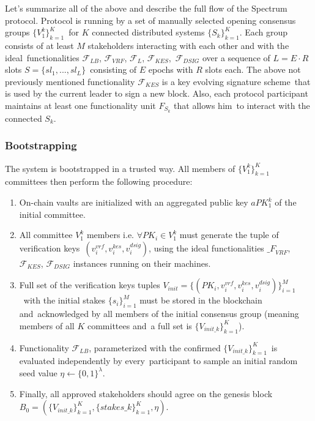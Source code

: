 Let's summarize all of the above and describe the full flow of the Spectrum protocol.
Protocol is running by a set of manually selected opening consensus groups $\{V^k_1\}_{k=1}^K$\
for $K$ connected distributed systems $\{S_k\}_{k=1}^K$.
Each group consists of at least $M$ stakeholders interacting with each other and with the ideal\
functionalities ${\mathcal{F}}_{LB}$, ${\mathcal{F}}_{VRF}$, ${\mathcal{F}}_{L}$, ${\mathcal{F}}_{KES}$,\
${\mathcal{F}}_{DSIG}$ over a sequence of $L = E \cdot R$ slots ${S=\{sl_1,...,sl_L\}}$\
consisting of $E$ epochs with $R$ slots each.
The above not previously mentioned functionality ${\mathcal{F}}_{KES}$ is a key evolving signature scheme\
that is used by the current leader to sign a new block.
Also, each protocol participant maintains at least one functionality unit $F_{S_k}$ that allows him\
to interact with the connected $S_k$.

\subsubsection{Bootstrapping}\label{subsubsec:bootstrapping}

The system is bootstrapped in a trusted way.
All members of $\{V^k_1\}_{k=1}^K$ committees then perform the following procedure:
\begin{enumerate}
    \item On-chain vaults are initialized with an aggregated public key $aPK^k_1$ of the initial committee.

    \item All committee $V^k_1$ members i.e. $\forall PK_i \in V^k_1$ must generate the tuple of verification keys\
    ${(v_i^{vrf}, v_i^{kes}, v_i^{dsig})}$, using the ideal functionalities ${\mathcal_{F}}_{VRF}$,\
    ${\mathcal{F}}_{KES}$, ${\mathcal{F}}_{DSIG}$ instances running on their machines.

    \item Full set of the verification keys tuples ${V_{init} = \{(PK_i, v_i^{vrf}, v_i^{kes}, v_i^{dsig})\}_{i=1}^M}$\
    with the initial stakes $\{s_i\}_{i=1}^M$ must be stored in the blockchain and\
    acknowledged by all members of the initial consensus group (meaning members of all $K$ committees and\
    a full set is $\{V_{init\_k}\}_{k=1}^{K}$).

    \item Functionality ${\mathcal{F}}_{LB}$, parameterized with the confirmed $\{V_{init\_k}\}_{k=1}^{K}$\
    is evaluated independently by every\
    participant to sample an initial random seed value $\eta \leftarrow \{0, 1\}^\lambda$.

    \item Finally, all approved stakeholders should agree on the genesis block\
    ${B_0=\left(\{V_{init\_k}\}_{k=1}^{K}, \{stakes\_k\}_{k=1}^{K}, \eta\right)}$.
\end{enumerate}

